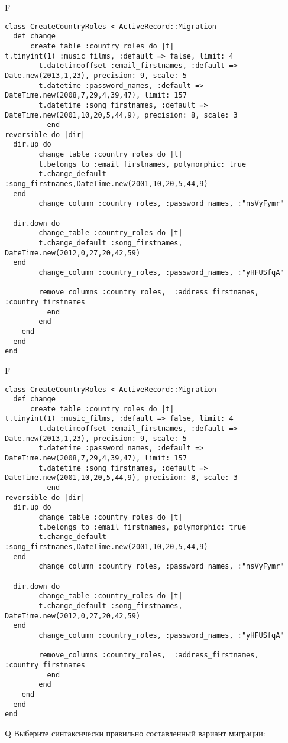 F
\begin{verbatim}
class CreateCountryRoles < ActiveRecord::Migration
  def change
	  create_table :country_roles do |t|
t.tinyint(1) :music_films, :default => false, limit: 4
		t.datetimeoffset :email_firstnames, :default => Date.new(2013,1,23), precision: 9, scale: 5
		t.datetime :password_names, :default => DateTime.new(2008,7,29,4,39,47), limit: 157
		t.datetime :song_firstnames, :default => DateTime.new(2001,10,20,5,44,9), precision: 8, scale: 3
		  end
reversible do |dir|
  dir.up do
		change_table :country_roles do |t|
		t.belongs_to :email_firstnames, polymorphic: true
 		t.change_default :song_firstnames,DateTime.new(2001,10,20,5,44,9)
  end
 		change_column :country_roles, :password_names, :"nsVyFymr"
   
  dir.down do
		change_table :country_roles do |t|
		t.change_default :song_firstnames, DateTime.new(2012,0,27,20,42,59)
  end
 		change_column :country_roles, :password_names, :"yHFUSfqA"
   
		remove_columns :country_roles,  :address_firstnames, :country_firstnames 
	      end
	    end
    end 
  end
end

\end{verbatim}

F
\begin{verbatim}
class CreateCountryRoles < ActiveRecord::Migration
  def change
	  create_table :country_roles do |t|
t.tinyint(1) :music_films, :default => false, limit: 4
		t.datetimeoffset :email_firstnames, :default => Date.new(2013,1,23), precision: 9, scale: 5
		t.datetime :password_names, :default => DateTime.new(2008,7,29,4,39,47), limit: 157
		t.datetime :song_firstnames, :default => DateTime.new(2001,10,20,5,44,9), precision: 8, scale: 3
		  end
reversible do |dir|
  dir.up do
		change_table :country_roles do |t|
		t.belongs_to :email_firstnames, polymorphic: true
 		t.change_default :song_firstnames,DateTime.new(2001,10,20,5,44,9)
  end
 		change_column :country_roles, :password_names, :"nsVyFymr"
   
  dir.down do
		change_table :country_roles do |t|
		t.change_default :song_firstnames, DateTime.new(2012,0,27,20,42,59)
  end
 		change_column :country_roles, :password_names, :"yHFUSfqA"
   
		remove_columns :country_roles,  :address_firstnames, :country_firstnames 
	      end
	    end
    end 
  end
end

\end{verbatim}

Q
Выберите синтаксически правильно составленный вариант миграции:

